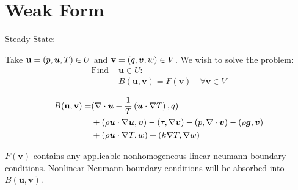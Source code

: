 \section{Weak Form}

Steady State:

Take $\mathbf{u} = (p, \boldsymbol{u}, T) \in U$ and $\mathbf{v} = (q, \boldsymbol{v}, w)
\in V$. We wish to solve the problem:
%
\begin{equation}
  \begin{split}
  \text{Find } &\mathbf{u} \in U: \\
  &B(\mathbf{u}, \mathbf{v}) = F(\mathbf{v}) \quad \forall \mathbf{v} \in V
  \end{split}
\end{equation}
%

\begin{equation}
  \begin{split}
  B(\mathbf{u}, \mathbf{v}) = &
  ( \nabla \cdot \boldsymbol{u} - \frac{1}{T} \left( \boldsymbol{u} \cdot \nabla T  \right),
  q )\\
  &+ ( \rho \boldsymbol{u} \cdot \nabla \boldsymbol{u}, \boldsymbol{v}) - (\tau, \nabla \boldsymbol{v}) - (p,\nabla
  \cdot \boldsymbol{v} ) - (\rho \boldsymbol{g}, \boldsymbol{v}) \\
  &+ (\rho \boldsymbol{u} \cdot \nabla T, w) + (k\nabla T, \nabla w)
  \end{split}
\end{equation}

$F(\mathbf{v})$ contains any applicable nonhomogeneous linear neumann
boundary conditions. Nonlinear Neumann boundary conditions will be
absorbed into $B(\mathbf{u}, \mathbf{v})$.
